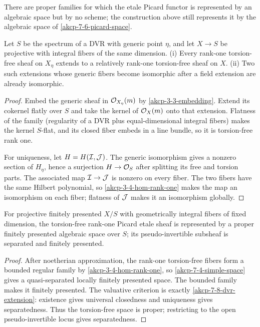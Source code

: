 \begin{remark}
\label{akcp-7-7-picard-not-scheme}
There are proper families for which the etale Picard functor is represented by
an algebraic space but by no scheme; the construction above still represents
it by the algebraic space of \cref{akcp-7-6-picard-space}.
\end{remark}

\begin{lemma}
\label{akcp-7-8-dvr-extension}
Let $S$ be the spectrum of a DVR with generic point $\eta$, and let
$X\to S$ be projective with integral fibers of the same dimension.  (i) Every
rank-one torsion-free sheaf on $X_\eta$ extends to a relatively rank-one
torsion-free sheaf on $X$.  (ii) Two such extensions whose generic fibers
become isomorphic after a field extension are already isomorphic.
\end{lemma}
\begin{proof}
Embed the generic sheaf in $\mathcal O_{X_\eta}(m)$ by
\cref{akcp-3-3-embedding}.  Extend its cokernel flatly over $S$ and take the
kernel of $\mathcal O_X(m)$ onto that extension.  Flatness of the family (regularity
of a DVR plus equal-dimensional integral fibers) makes the kernel $S$-flat,
and its closed fiber embeds in a line bundle, so it is torsion-free rank one.

For uniqueness, let $H=H(\mathcal I,\mathcal J)$.  The generic isomorphism gives a nonzero
section of $H_\eta$, hence a surjection $H\to\mathcal O_S$ after splitting its free
and torsion parts.  The associated map $\mathcal I\to\mathcal J$ is nonzero on every fiber.
The two fibers have the same Hilbert polynomial, so
\cref{akcp-3-4-hom-rank-one} makes the map an isomorphism on each fiber; flatness
of $\mathcal J$ makes it an isomorphism globally.
\end{proof}

\begin{theorem}
\label{akcp-7-9-picard-proper-space}
For projective finitely presented $X/S$ with geometrically integral fibers of
fixed dimension, the torsion-free rank-one Picard etale sheaf is represented by
a proper finitely presented algebraic space over $S$; its pseudo-invertible
subsheaf is separated and finitely presented.
\end{theorem}
\begin{proof}
After noetherian approximation, the rank-one torsion-free fibers form a bounded
regular family by \cref{akcp-3-4-hom-rank-one}, so
\cref{akcp-7-4-simple-space} gives a quasi-separated locally finitely presented
space.  The bounded family makes it finitely presented.  The valuative
criterion is exactly \cref{akcp-7-8-dvr-extension}: existence gives universal
closedness and uniqueness gives separatedness.  Thus the torsion-free space is
proper; restricting to the open pseudo-invertible locus gives separatedness.
\end{proof}
